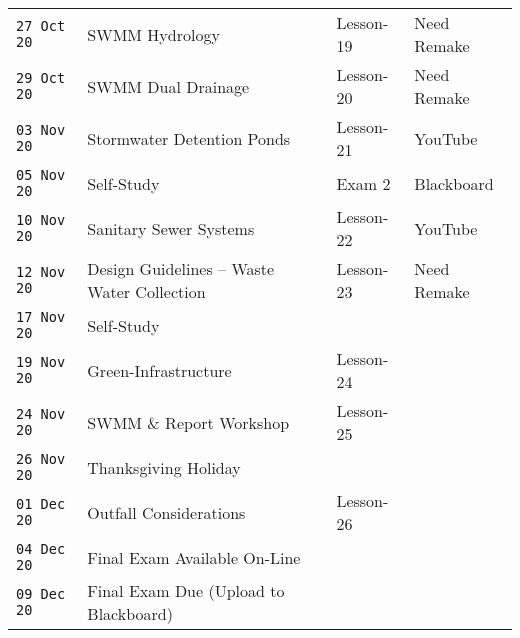 \documentclass[12pt]{article}
\begin{document}
\begin{center}
\begin{table}[ht!]
\begin{tabular}{| p{0.8in} | p{3.4in} | p{1.0in} | p{1.0in} |}
\hline
\texttt{27 Oct 20} & SWMM Hydrology  & Lesson-19 & Need Remake  \\
\texttt{29 Oct 20} & SWMM Dual Drainage& Lesson-20 & Need Remake  \\ 
\hline
\texttt{03 Nov 20} & Stormwater Detention Ponds & Lesson-21 & YouTube \\
\texttt{05 Nov 20} & Self-Study & Exam 2 & Blackboard  \\
\hline
\texttt{10 Nov 20} & Sanitary Sewer Systems & Lesson-22 & YouTube  \\
\texttt{12 Nov 20} & Design Guidelines -- Waste Water Collection  & Lesson-23 & Need Remake  \\
\hline
\texttt{17 Nov 20} & Self-Study &  &   \\
\texttt{19 Nov 20} & Green-Infrastructure & Lesson-24 &   \\
\hline
\texttt{24 Nov 20} & SWMM \& Report Workshop & Lesson-25 &   \\
\texttt{26 Nov 20} & Thanksgiving Holiday &  &  \\
\hline
\texttt{01 Dec 20} & Outfall Considerations & Lesson-26 & \\
\hline
\hline
\texttt{04 Dec 20} & Final Exam Available On-Line &  &  \\
\texttt{09 Dec 20} & Final Exam Due (Upload to Blackboard) &  &  \\
\hline
\hline
   \end{tabular}
   \label{tab:fall2013scheduleA}
\end{table}
\end{center}
\clearpage
\end{document}
